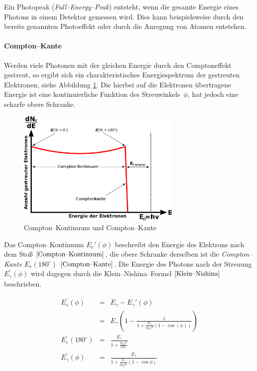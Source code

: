 \documentclass[12pt,a4paper]{scrartcl}
\numberwithin{equation}{section} %
\begin{document}
Ein Photopeak (\emph{Full--Energy--Peak}) entsteht, wenn die gesamte Energie eines Photons in einem Detektor gemessen wird. Dies kann beispielsweise durch den bereits genannten Photoeffekt oder durch die Anregung von Atomen entstehen.

\paragraph{Compton--Kante}

Werden viele Photonen mit der gleichen Energie durch den Comptoneffekt gestreut, so ergibt sich ein charakteristisches Energiespektrum der gestreuten Elektronen, siehe Abbildung \ref{abb:Compton-Kante}. Die hierbei auf die Elektronen übertragene Energie ist eine kontinuierliche Funktion des Streuwinkels~$\phi$, hat jedoch eine scharfe obere Schranke.

\begin{figure}[h]
	\centering
	\includegraphics[width=0.7\textwidth]{../media/B3.4/Comptonspektrum.jpg}
	\caption{Compton--Kontinuum und Compton--Kante \cite{abb:Compton}}
	\label{abb:Compton-Kante}
\end{figure}

Das Compton--Kontinuum $E_e'(\phi)$ beschreibt den Energie des Elektrons nach dem Stoß $\eqref{Compton--Kontinuum}$, die obere Schranke derselben ist die \emph{Compton--Kante} $E_e(180^\circ)$ $\eqref{Compton--Kante}$. Die Energie des Photons nach der Streuung $E_{\gamma}^\prime(\phi)$ wird dagegen durch die Klein--Nishina--Formel $\eqref{Klein--Nishina}$ beschrieben.

\begin{eqnarray}
    E_e^\prime(\phi)
        &=& E_{\gamma} - E_{\gamma}'(\phi) \\
        &=& E_{\gamma}
            \left(
                1-
                \frac{1}{1+\frac{E_{\gamma}}{m_\mathrm ec^2}
                    (1-\cos(\phi))}
            \right) \label{Compton--Kontinuum} \\
    E_e^\prime(180^\circ) &=& \frac{E_\gamma}{1+\frac{m_ec^2}{2E_\gamma}}
        \label{Compton--Kante} \\
    E_{\gamma}^\prime(\phi)
        &=& \frac{E_{\gamma}}{1+\frac{E_{\gamma}}{m_\mathrm ec^2}
            (1-\cos\phi)} \label{Klein--Nishina}
\end{eqnarray}
\end{document}

